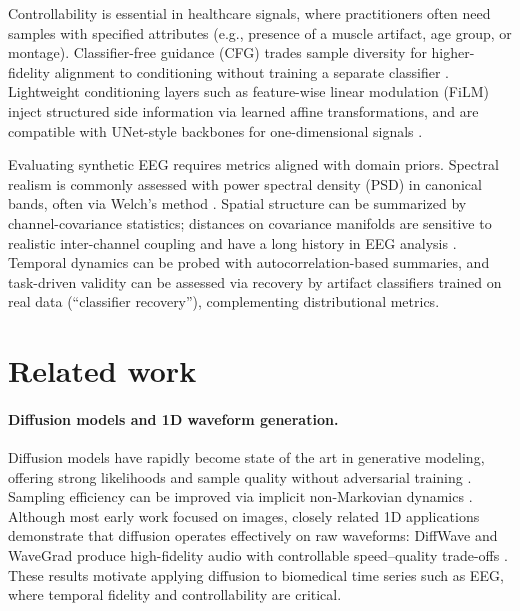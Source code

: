 \documentclass{article}
\begin{document}
Controllability is essential in healthcare signals, where practitioners often need samples with specified attributes (e.g., presence of a muscle artifact, age group, or montage). Classifier-free guidance (CFG) trades sample diversity for higher-fidelity alignment to conditioning without training a separate classifier \citep{ho2022cfg}. Lightweight conditioning layers such as feature-wise linear modulation (FiLM) inject structured side information via learned affine transformations, and are compatible with UNet-style backbones for one-dimensional signals \citep{perez2018film}.

Evaluating synthetic EEG requires metrics aligned with domain priors. Spectral realism is commonly assessed with power spectral density (PSD) in canonical bands, often via Welch’s method \citep{welch1967psd,nayak2023statpearls}. Spatial structure can be summarized by channel-covariance statistics; distances on covariance manifolds are sensitive to realistic inter-channel coupling and have a long history in EEG analysis \citep{barachant2013riemannian}. Temporal dynamics can be probed with autocorrelation-based summaries, and task-driven validity can be assessed via recovery by artifact classifiers trained on real data (``classifier recovery''), complementing distributional metrics.



\section{Related work}

\paragraph{Diffusion models and 1D waveform generation.}
Diffusion models have rapidly become state of the art in generative modeling, offering strong likelihoods and sample quality without adversarial training \citep{ho2020ddpm,dhariwal2021dmbeatgans}. Sampling efficiency can be improved via implicit non-Markovian dynamics \citep{song2020ddim}. Although most early work focused on images, closely related 1D applications demonstrate that diffusion operates effectively on raw waveforms: DiffWave and WaveGrad produce high-fidelity audio with controllable speed–quality trade-offs \citep{kong2020diffwave,chen2020wavegrad}. These results motivate applying diffusion to biomedical time series such as EEG, where temporal fidelity and controllability are critical.
\end{document}
